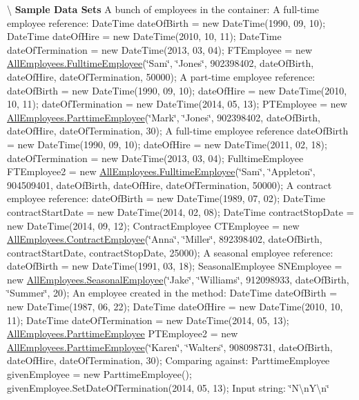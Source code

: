 \textbackslash{} {\bfseries  Sample Data Sets} A bunch of employees in the container\+: A full-\/time employee reference\+: Date\+Time date\+Of\+Birth = new Date\+Time(1990, 09, 10); Date\+Time date\+Of\+Hire = new Date\+Time(2010, 10, 11); Date\+Time date\+Of\+Termination = new Date\+Time(2013, 03, 04); F\+T\+Employee = new \hyperlink{class_all_employees_1_1_fulltime_employee}{All\+Employees.\+Fulltime\+Employee}(\char`\"{}\+Sam\char`\"{}, \char`\"{}\+Jones\char`\"{}, 902398402, date\+Of\+Birth, date\+Of\+Hire, date\+Of\+Termination, 50000); A part-\/time employee reference\+: date\+Of\+Birth = new Date\+Time(1990, 09, 10); date\+Of\+Hire = new Date\+Time(2010, 10, 11); date\+Of\+Termination = new Date\+Time(2014, 05, 13); P\+T\+Employee = new \hyperlink{class_all_employees_1_1_parttime_employee}{All\+Employees.\+Parttime\+Employee}(\char`\"{}\+Mark\char`\"{}, \char`\"{}\+Jones\char`\"{}, 902398402, date\+Of\+Birth, date\+Of\+Hire, date\+Of\+Termination, 30); A full-\/time employee reference date\+Of\+Birth = new Date\+Time(1990, 09, 10); date\+Of\+Hire = new Date\+Time(2011, 02, 18); date\+Of\+Termination = new Date\+Time(2013, 03, 04); Fulltime\+Employee F\+T\+Employee2 = new \hyperlink{class_all_employees_1_1_fulltime_employee}{All\+Employees.\+Fulltime\+Employee}(\char`\"{}\+Sam\char`\"{}, \char`\"{}\+Appleton\char`\"{}, 904509401, date\+Of\+Birth, date\+Of\+Hire, date\+Of\+Termination, 50000); A contract employee reference\+: date\+Of\+Birth = new Date\+Time(1989, 07, 02); Date\+Time contract\+Start\+Date = new Date\+Time(2014, 02, 08); Date\+Time contract\+Stop\+Date = new Date\+Time(2014, 09, 12); Contract\+Employee C\+T\+Employee = new \hyperlink{class_all_employees_1_1_contract_employee}{All\+Employees.\+Contract\+Employee}(\char`\"{}\+Anna\char`\"{}, \char`\"{}\+Miller\char`\"{}, 892398402, date\+Of\+Birth, contract\+Start\+Date, contract\+Stop\+Date, 25000); A seasonal employee reference\+: date\+Of\+Birth = new Date\+Time(1991, 03, 18); Seasonal\+Employee S\+N\+Employee = new \hyperlink{class_all_employees_1_1_seasonal_employee}{All\+Employees.\+Seasonal\+Employee}(\char`\"{}\+Jake\char`\"{}, \char`\"{}\+Williams\char`\"{}, 912098933, date\+Of\+Birth, \char`\"{}\+Summer\char`\"{}, 20); An employee created in the method\+: Date\+Time date\+Of\+Birth = new Date\+Time(1987, 06, 22); Date\+Time date\+Of\+Hire = new Date\+Time(2010, 10, 11); Date\+Time date\+Of\+Termination = new Date\+Time(2014, 05, 13); \hyperlink{class_all_employees_1_1_parttime_employee}{All\+Employees.\+Parttime\+Employee} P\+T\+Employee2 = new \hyperlink{class_all_employees_1_1_parttime_employee}{All\+Employees.\+Parttime\+Employee}(\char`\"{}\+Karen\char`\"{}, \char`\"{}\+Walters\char`\"{}, 908098731, date\+Of\+Birth, date\+Of\+Hire, date\+Of\+Termination, 30); Comparing against\+: Parttime\+Employee given\+Employee = new Parttime\+Employee(); given\+Employee.\+Set\+Date\+Of\+Termination(2014, 05, 13); Input string\+: \char`\"{}\+N\textbackslash{}n\+Y\textbackslash{}n\char`\"{}

